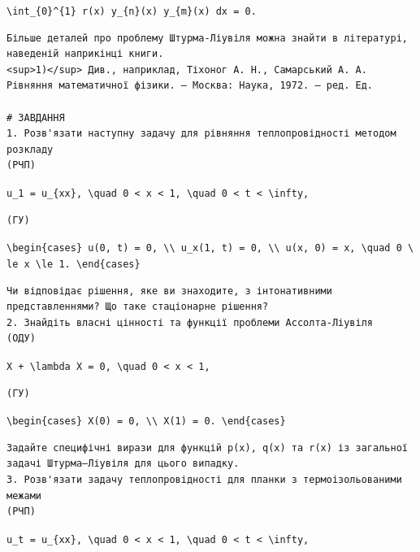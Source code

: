 \documentclass[
  ukrainian,
]{article}
\begin{document}
\texttt{\textbackslash{}int\_\{0\}\^{}\{1\}\ r(x)\ y\_\{n\}(x)\ y\_\{m\}(x)\ dx\ =\ 0.}

\begin{verbatim}
Більше деталей про проблему Штурма-Ліувіля можна знайти в літературі, наведеній наприкінці книги.
<sup>1)</sup> Див., наприклад, Тіхоног А. Н., Самарський А. А. Рівняння математичної фізики. — Москва: Наука, 1972. — ред. Ед.

# ЗАВДАННЯ
1. Розв'язати наступну задачу для рівняння теплопровідності методом розкладу
(PЧП)
\end{verbatim}

\texttt{u\_1\ =\ u\_\{xx\},\ \textbackslash{}quad\ 0\ \textless{}\ x\ \textless{}\ 1,\ \textbackslash{}quad\ 0\ \textless{}\ t\ \textless{}\ \textbackslash{}infty,}

\begin{verbatim}
(ГУ)
\end{verbatim}

\texttt{\textbackslash{}begin\{cases\}\ u(0,\ t)\ =\ 0,\ \textbackslash{}\textbackslash{}\ u\_x(1,\ t)\ =\ 0,\ \textbackslash{}\textbackslash{}\ u(x,\ 0)\ =\ x,\ \textbackslash{}quad\ 0\ \textbackslash{}le\ x\ \textbackslash{}le\ 1.\ \textbackslash{}end\{cases\}}

\begin{verbatim}
Чи відповідає рішення, яке ви знаходите, з інтонативними представленнями? Що таке стаціонарне рішення?
2. Знайдіть власні цінності та функції проблеми Ассолта-Ліувіля
(ОДУ)
\end{verbatim}

\texttt{X\textquotesingle{}\ +\ \textbackslash{}lambda\ X\ =\ 0,\ \textbackslash{}quad\ 0\ \textless{}\ x\ \textless{}\ 1,}

\begin{verbatim}
(ГУ)
\end{verbatim}

\texttt{\textbackslash{}begin\{cases\}\ X(0)\ =\ 0,\ \textbackslash{}\textbackslash{}\ X\textquotesingle{}(1)\ =\ 0.\ \textbackslash{}end\{cases\}}

\begin{verbatim}
Задайте специфічні вирази для функцій p(x), q(x) та r(x) із загальної задачі Штурма–Ліувіля для цього випадку.
3. Розв'язати задачу теплопровідності для планки з термоізольованими межами
(РЧП)
\end{verbatim}

\texttt{u\_t\ =\ u\_\{xx\},\ \textbackslash{}quad\ 0\ \textless{}\ x\ \textless{}\ 1,\ \textbackslash{}quad\ 0\ \textless{}\ t\ \textless{}\ \textbackslash{}infty,}
\end{document}
